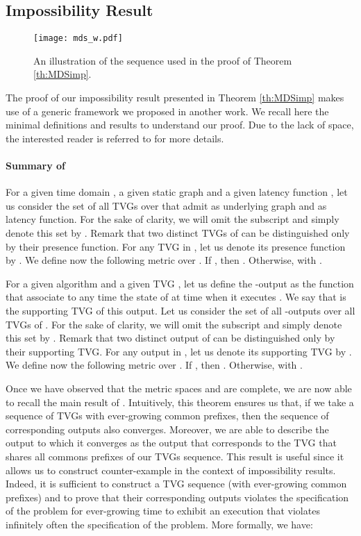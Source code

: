 \documentclass{article}
\begin{document}
\subsection{Impossibility Result}\label{sub:MDSimp}

\begin{figure*}[htb]
  \centering 
  \texttt{[image: mds\_w.pdf]}
  \caption{An illustration of the sequence  used in the proof of Theorem \ref{th:MDSimp}. \label{fig:impossibility}}
\end{figure*}

The proof of our impossibility result presented in Theorem \ref{th:MDSimp} makes use of a generic framework we proposed in another work. We recall here the minimal definitions and results to understand our proof. Due to the lack of space, the interested reader is referred to \cite{BDKP14r} for more details. 

\paragraph{Summary of \cite{BDKP14r}} For a given time domain , a given static graph  and a given latency function , let us consider the set  of all TVGs over  that admit  as underlying graph and  as latency function. For the sake of clarity, we will omit the subscript  and simply denote this set by . Remark that two distinct TVGs of  can be distinguished only by their presence function. For any TVG  in , let us denote its presence function by . We define now the following metric  over . If , then . Otherwise,  with .

For a given algorithm  and a given TVG , let us define the -output as the function that associate to any time  the state of  at time  when it executes . We say that  is the supporting TVG of this output. Let us consider the set  of all -outputs over all TVGs  of . For the sake of clarity, we will omit the subscript  and simply denote this set by . Remark that two distinct output of  can be distinguished only by their supporting TVG. For any output  in , let us denote its supporting TVG by . We define now the following metric  over . If , then . Otherwise,  with .

Once we have observed that the metric spaces  and  are complete, we are now able to recall the main result of \cite{BDKP14r}. Intuitively, this theorem ensures us that, if we take a sequence of TVGs with ever-growing common prefixes, then the sequence of corresponding outputs also converges. Moreover, we are able to describe the output to which it converges as the output that corresponds to the TVG that shares all commons prefixes of our TVGs sequence. This result is useful since it allows us to construct counter-example in the context of impossibility results. Indeed, it is sufficient to construct a TVG sequence (with ever-growing common prefixes) and to prove that their corresponding outputs violates the specification of the problem for ever-growing time to exhibit an execution that violates infinitely often the specification of the problem. More formally, we have:
\end{document}
